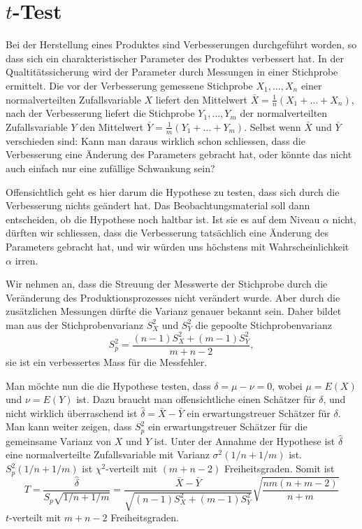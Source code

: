 \section{\texorpdfstring{$t$}{t}-Test} \label{section-t-test}
Bei der Herstellung eines Produktes sind Verbesserungen durchgeführt worden,
so dass sich ein charakteristischer Parameter des Produktes verbessert hat.
In der Qualtitätssicherung wird der Parameter durch Messungen in einer
Stichprobe ermittelt.
Die vor der Verbesserung gemessene Stichprobe
$X_1,\dots,X_n$
einer normalverteilten Zufallsvariable $X$ liefert den Mittelwert
$\bar X=\frac1n(X_1+\dots+X_n)$, nach
der Verbesserung liefert die Stichprobe $Y_1,\dots,Y_m$ der normalverteilten
Zufallsvariable $Y$ den Mittelwert
$\bar Y=\frac1m(Y_1+\dots+Y_m)$.
Selbst wenn $\bar X$ und $\bar Y$
verschieden sind: Kann man daraus wirklich schon schliessen, dass die
Verbesserung eine Änderung des Parameters gebracht hat, oder könnte
das nicht auch einfach nur eine zufällige Schwankung sein?

Offensichtlich geht es hier darum die Hypothese zu testen, dass sich
durch die Verbesserung nichts geändert hat.
Das Beobachtungsmaterial
soll dann entscheiden, ob die Hypothese noch haltbar ist.
Ist sie es
auf dem Niveau $\alpha$ nicht,
dürften wir schliessen, dass die Verbesserung tatsächlich eine Änderung
des Parameters gebracht hat, und wir würden uns höchstens mit 
Wahrscheinlichkeit $\alpha$ irren.

Wir nehmen an, dass die Streuung der Messwerte der Stichprobe durch die
Veränderung des Produktionsprozesses nicht verändert wurde.
Aber durch
die zusätzlichen Messungen dürfte die Varianz genauer bekannt sein.
Daher bildet man aus der Stichprobenvarianz $S_X^2$ und $S_Y^2$
die gepoolte Stichprobenvarianz
\begin{equation}
S_p^2=\frac{(n-1)S_X^2+(m-1)S_Y^2}{m+n-2},
\label{pooled-variance}
\end{equation}
sie ist ein verbessertes Mass für die Messfehler.

Man möchte nun die die Hypothese testen, dass $\delta=\mu-\nu=0$, wobei
$\mu=E(X)$ und $\nu=E(Y)$ ist.
Dazu braucht man offensichtliche einen
Schätzer für $\delta$, und nicht wirklich überraschend ist
$\hat\delta=\bar X-\bar Y$ ein erwartungstreuer Schätzer für $\delta$.
Man kann weiter zeigen, dass $S_p^2$ ein erwartungstreuer Schätzer
für die gemeinsame Varianz von $X$ und $Y$ ist.
Unter der Annahme der
Hypothese ist $\hat\delta$ eine normalverteilte Zufallsvariable
mit Varianz $\sigma^2(1/n+1/m)$ ist.
$S_p^2(1/n+1/m)$ ist $\chi^2$-verteilt
mit $(m+n-2)$ Freiheitsgraden.
Somit ist 
\begin{equation}
T=\frac{\hat\delta}{S_p\sqrt{1/n+1/m}}
=\frac{\bar X-\bar Y}{\sqrt{(n-1)S_X^2+(m-1)S_Y^2}}\sqrt{\frac{nm(n+m-2)}{n+m}}
\label{t-test-ausdruck}
\end{equation}
$t$-verteilt mit $m+n-2$ Freiheitsgraden.


